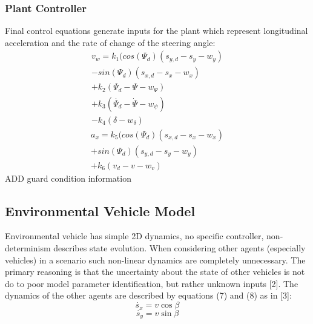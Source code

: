 \subsubsection{Plant Controller}
Final control equations generate inputs for the plant which represent longitudinal acceleration and the rate of change of the steering angle:
	\begin{equation}
	\begin{aligned}
	v_w=k_1(cos{(\Psi_d)}(s_{y,d}-s_y-w_y)\\
	-sin{(\Psi_d)}(s_{x,d}-s_x-w_x)\\ 
	+k_2(\Psi_d-\Psi-w_{\Psi}) \\
	+k_3(\dot{\Psi_d} -\dot{\Psi}-w_{\psi})\\
	-k_4(\delta-w_{\delta})
	\end{aligned}
	\end{equation}
	\begin{equation}
	\begin{aligned}
	a_x=k_5(cos{(\Psi_d)}(s_{x,d}-s_x-w_x)\\
	+sin{(\Psi_d)}(s_{y,d}-s_y-w_y)\\
	+k_6(v_d-v-w_v)
	\end{aligned}
	\end{equation}
ADD guard condition information


\subsection{Environmental Vehicle Model}
Environmental vehicle has simple 2D dynamics, no specific controller, non-determinism describes state evolution. When considering other agents (especially vehicles) in a scenario such non-linear dynamics are completely unnecessary. The primary reasoning is that the uncertainty about the state of other vehicles is not do to poor model parameter identification, but rather unknown inputs [2]. The dynamics of the other agents are described by equations (7) and (8) as in [3]:
\begin{equation}
\dot{s_x}=v\cos{\beta}
\end{equation}
\begin{equation}
\dot{s_y}=v\sin{\beta}
\end{equation}

